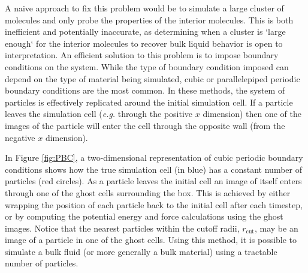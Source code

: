 A naive approach to fix this problem would be to simulate a large
cluster of molecules and only probe the properties of the interior
molecules. This is both inefficient and potentially inaccurate, as
determining when a cluster is `large enough` for the interior
molecules to recover bulk liquid behavior is open to
interpretation. An efficient solution to this problem is to impose
boundary conditions on the system. While the type of boundary
condition imposed can depend on the type of material being simulated,
cubic or parallelepiped periodic boundary conditions are the most
common. In these methods, the system of particles is
effectively replicated around the initial simulation cell. If a
particle leaves the simulation cell (\textit{e.g.} through the
positive $x$ dimension) then one of the images of the particle will
enter the cell through the opposite wall (from the negative $x$
dimension).

In Figure \ref{fig:PBC}, a two-dimensional representation of cubic
periodic boundary conditions shows how the true simulation cell (in
blue) has a constant number of particles (red circles). As a particle
leaves the initial cell an image of itself enters through one of the
ghost cells surrounding the box. This is achieved by either wrapping
the position of each particle back to the initial cell after each
timestep, or by computing the potential energy and force calculations
using the ghost images. Notice that the nearest particles within the
cutoff radii, $r_{\mathrm{cut}}$, may be an image of a particle in one
of the ghost cells. Using this method, it is possible to simulate a
bulk fluid (or more generally a bulk material) using a tractable
number of particles.

